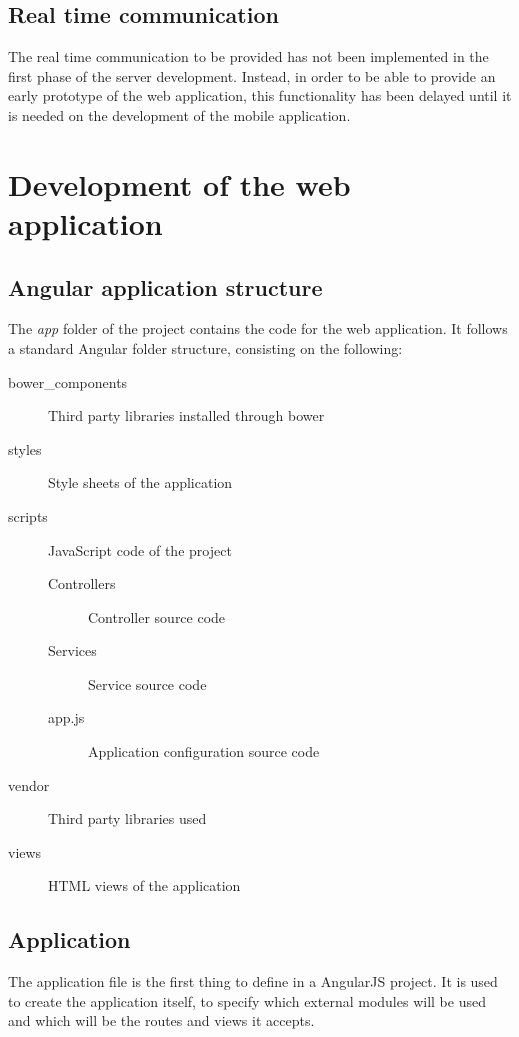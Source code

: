 \subsection{Real time communication}

The real time communication to be provided has not been implemented in the first phase of the server development. Instead, in order to be able to provide an early prototype of the web application, this functionality has been delayed until it is needed on the development of the mobile application. 

\section{Development of the web application}\label{sec:webappdev}

\subsection{Angular application structure}

The \textit{app} folder of the project contains the code for the web application. It follows a standard Angular folder structure, consisting on the following:

\begin{description}
\item[bower\_components] Third party libraries installed through bower
\item[styles] Style sheets of the application
\item[scripts] JavaScript code of the project
  \begin{description}
  \item[Controllers] Controller source code
  \item[Services] Service source code
  \item[app.js] Application configuration source code 
  \end{description}
\item[vendor] Third party libraries used
\item[views] HTML views of the application
\end{description}

\subsection{Application}

The application file is the first thing to define in a AngularJS project. It is used to create the application itself, to specify which external modules will be used and which will be the routes and views it accepts.

